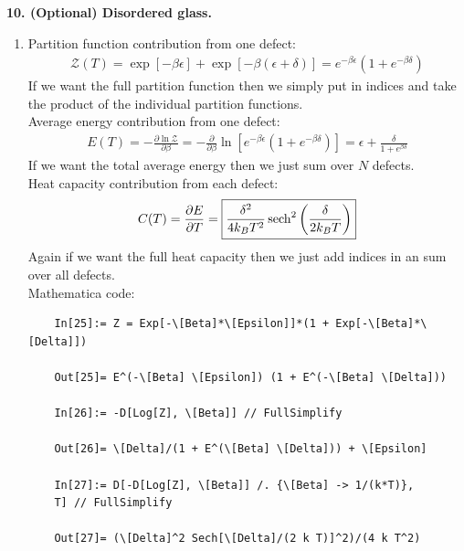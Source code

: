 \documentclass{article}
\theoremstyle{definition}
\newcommand{\p}{\partial}
\newcommand{\be}{\beta}
\newcommand{\f}[2]{\frac{#1}{#2}}
\newcommand{\lp}{\left(}
\newcommand{\rp}{\right)}
\newcommand{\lb}{\left[}
\newcommand{\rb}{\right]}
\begin{document}
\noindent \textbf{10. (Optional) Disordered glass.}


\begin{enumerate}[label=(\alph*)]
	\item Partition function contribution from one defect:
	\begin{align*}
	\mathcal{Z}(T) 
	=  \exp[{-\be\epsilon}] + \exp[-\be(\epsilon + \delta)] = \boxed{e^{-\be\epsilon}\lp 1 + e^{-\be \delta} \rp}
	\end{align*}
	If we want the full partition function then we simply put in indices and take the product of the individual partition functions.\\
	
	Average energy contribution from one defect:
	\begin{align*}
	E(T) = -\f{\p \ln \mathcal{Z} }{\p \be}= -\f{\p}{\p \be}\ln \lb e^{-\be\epsilon}\lp 1 + e^{-\be \delta} \rp \rb = 
	\boxed{\epsilon + \f{\delta}{1 + e^{\be \delta}}}
	\end{align*}
	If we want the total average energy then we just sum over $N$ defects. \\
	
	
	Heat capacity contribution from each defect:
	\begin{align*}
	C(T) = \f{\p E}{\p T} = 
	\boxed{\f{\delta^2}{4k_BT^2}\sech^2\lp \f{\delta}{2k_BT} \rp}
	\end{align*}
	Again if we want the full heat capacity then we just add indices in an sum over all defects. \\
	
	
	
	Mathematica code:
	\begin{lstlisting}
	In[25]:= Z = Exp[-\[Beta]*\[Epsilon]]*(1 + Exp[-\[Beta]*\[Delta]])
	
	Out[25]= E^(-\[Beta] \[Epsilon]) (1 + E^(-\[Beta] \[Delta]))
	
	In[26]:= -D[Log[Z], \[Beta]] // FullSimplify
	
	Out[26]= \[Delta]/(1 + E^(\[Beta] \[Delta])) + \[Epsilon]
	
	In[27]:= D[-D[Log[Z], \[Beta]] /. {\[Beta] -> 1/(k*T)}, 
	T] // FullSimplify
	
	Out[27]= (\[Delta]^2 Sech[\[Delta]/(2 k T)]^2)/(4 k T^2)
	\end{lstlisting}
	

\end{enumerate}
\end{document}
